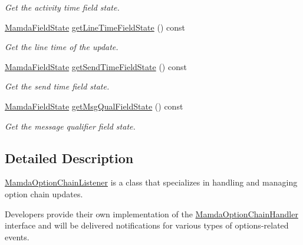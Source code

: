 \begin{CompactItemize}
\begin{CompactList}\small\item\em Get the activity time field state. \item\end{CompactList}\item 
\hyperlink{namespaceWombat_93aac974f2ab713554fd12a1fa3b7d2a}{Mamda\-Field\-State} \hyperlink{classWombat_1_1MamdaOptionChainListener_659564bc5b35a81418fa01d1c4982ad5}{get\-Line\-Time\-Field\-State} () const 
\begin{CompactList}\small\item\em Get the line time of the update. \item\end{CompactList}\item 
\hyperlink{namespaceWombat_93aac974f2ab713554fd12a1fa3b7d2a}{Mamda\-Field\-State} \hyperlink{classWombat_1_1MamdaOptionChainListener_6034b14704cebdcddf147a4cf9316637}{get\-Send\-Time\-Field\-State} () const 
\begin{CompactList}\small\item\em Get the send time field state. \item\end{CompactList}\item 
\hyperlink{namespaceWombat_93aac974f2ab713554fd12a1fa3b7d2a}{Mamda\-Field\-State} \hyperlink{classWombat_1_1MamdaOptionChainListener_55c3258edcbe570b4a68dd463b0f0f24}{get\-Msg\-Qual\-Field\-State} () const 
\begin{CompactList}\small\item\em Get the message qualifier field state. \item\end{CompactList}\end{CompactItemize}


\subsection{Detailed Description}
\hyperlink{classWombat_1_1MamdaOptionChainListener}{Mamda\-Option\-Chain\-Listener} is a class that specializes in handling and managing option chain updates. 

Developers provide their own implementation of the \hyperlink{classWombat_1_1MamdaOptionChainHandler}{Mamda\-Option\-Chain\-Handler} interface and will be delivered notifications for various types of options-related events. 



